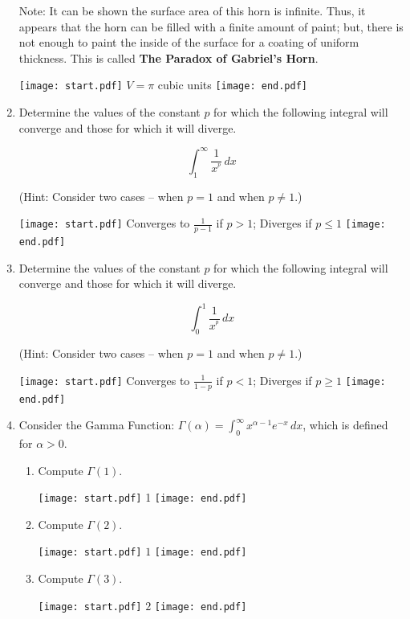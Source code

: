 \documentclass[12pt]{article}
\begin{document}
\begin{enumerate}
\bigskip

Note: It can be shown the surface area of this horn is infinite.  Thus, it appears that the horn can be filled with a finite amount of paint; but, there is not enough to paint the inside of the surface for a coating of uniform thickness.  This is called {\bf The Paradox of Gabriel's Horn}.

\texttt{[image: start.pdf]}
{{$V=\pi$ cubic units}}
\texttt{[image: end.pdf]}


\item Determine the values of the constant $p$ for which the following integral will converge and those for which it will diverge.  

$$\int_1^\infty \frac{1}{x^{^p}} \,dx$$

(Hint: Consider two cases -- when $p=1$ and when $p \neq 1$.)

\texttt{[image: start.pdf]}
{{Converges to $\frac{1}{p-1}$ if $p>1$; Diverges if $p \leq 1$}}
\texttt{[image: end.pdf]}


\newpage

\item Determine the values of the constant $p$ for which the following integral will converge and those for which it will diverge.  

$$\int_0^1 \frac{1}{x^{^p}} \,dx$$

(Hint: Consider two cases -- when $p=1$ and when $p \neq 1$.)

\texttt{[image: start.pdf]}
{{Converges to $\frac{1}{1-p}$ if $p<1$; Diverges if $p \geq 1$}}
\texttt{[image: end.pdf]}


\item Consider the Gamma Function: $\Gamma(\alpha)=\int_0^{\infty} x^{\alpha-1}e^{-x} \,dx$, which is defined for $\alpha>0$.

\begin{enumerate}

\item Compute $\Gamma(1)$.

\texttt{[image: start.pdf]}
{{1}}
\texttt{[image: end.pdf]}


\item Compute $\Gamma(2)$.

\texttt{[image: start.pdf]}
{{$1$}}
\texttt{[image: end.pdf]}


\item Compute $\Gamma(3)$.

\texttt{[image: start.pdf]}
{{$2$}}
\texttt{[image: end.pdf]}



\end{enumerate}
\end{enumerate}
\end{document}
